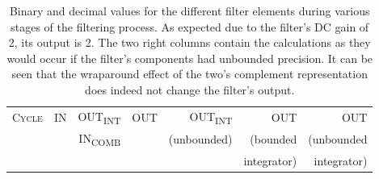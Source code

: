 \begin{table}
    \centering
    \caption[CIC Filter Example: States for 16 Cycles]{%
        Binary and  decimal values  for the  different filter  elements during
        various  stages  of the  filtering  process. As  expected due  to  the
        filter's  DC gain  of \num{2},  its output  is \num{2}. The  two right
        columns contain the  calculations as they would occur  if the filter's
        components had unbounded precision. It can be seen that the wraparound
        effect of the  two's complement representation does  indeed not change
        the filter's output.%
    }
    \label{tab:cic_simu:cic_filter_states}
    \ttfamily
    \begin{tabular}{rrrr|rrr}
        \toprule
        \scshape Cycle                   &
        \scshape IN                      &
        \scshape OUT\textsubscript{INT}  &
        \scshape OUT                     &
        \scshape OUT\textsubscript{INT}  &
        \scshape OUT                     &
        \scshape OUT                     \\

        &
        &
        \scshape IN\textsubscript{COMB} &
        &
        (unbounded) &
        (bounded    &
        (unbounded  \\

        &
        &
        &
        &
        &
        integrator) &
        integrator) \\


\end{tabular}
\end{table}
